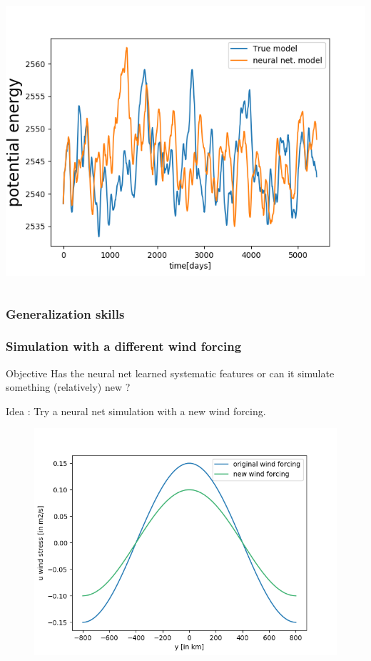 \documentclass[handout]{beamer}
\begin{document}
\begin{frame}
\begin{columns}
\includegraphics[width=\textwidth]{./fig/L3/evol-EP.png}
\end{columns}
\end{frame}

\begin{frame}
\frametitle{Generalization skills}
\frametitle{Simulation with a different wind forcing}
\begin{alertblock}{Objective}
Has the neural net learned systematic features or can it simulate something (relatively) new ?
\end{alertblock}
\pause
Idea : Try a neural net simulation with a new wind forcing.
\begin{figure}
\includegraphics[width=.6\textwidth]{./fig/L3/wind_forcing.png}
\end{figure}
\end{frame}
\end{document}

